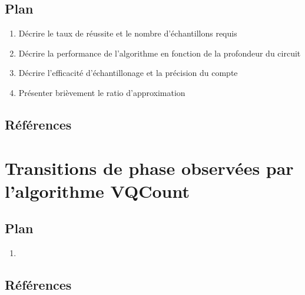 \subsection*{Plan}

\begin{enumerate}
    \item  Décrire le taux de réussite et le nombre d'échantillons requis
    \item  Décrire la performance de l'algorithme en fonction de la profondeur du circuit
    \item Décrire l'efficacité d'échantillonage et la précision du compte
    \item Présenter brièvement le ratio d'approximation
\end{enumerate}

\subsection*{Références}


\section{Transitions de phase observées par l'algorithme VQCount}

\subsection*{Plan}

\begin{enumerate}
    \item 
\end{enumerate}

\subsection*{Références}


